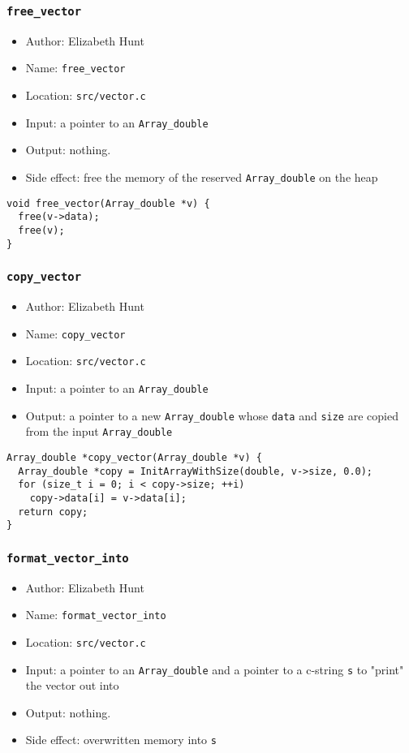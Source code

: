 \documentclass[11pt]{article}
\begin{document}
\subsubsection{\texttt{free\_vector}}
\label{sec:org983efcf}
\begin{itemize}
\item Author: Elizabeth Hunt
\item Name: \texttt{free\_vector}
\item Location: \texttt{src/vector.c}
\item Input: a pointer to an \texttt{Array\_double}
\item Output: nothing.
\item Side effect: free the memory of the reserved \texttt{Array\_double} on the heap
\end{itemize}

\begin{verbatim}
void free_vector(Array_double *v) {
  free(v->data);
  free(v);
}
\end{verbatim}

\subsubsection{\texttt{copy\_vector}}
\label{sec:orgde05d32}
\begin{itemize}
\item Author: Elizabeth Hunt
\item Name: \texttt{copy\_vector}
\item Location: \texttt{src/vector.c}
\item Input: a pointer to an \texttt{Array\_double}
\item Output: a pointer to a new \texttt{Array\_double} whose \texttt{data} and \texttt{size} are copied from the input
\texttt{Array\_double}
\end{itemize}

\begin{verbatim}
Array_double *copy_vector(Array_double *v) {
  Array_double *copy = InitArrayWithSize(double, v->size, 0.0);
  for (size_t i = 0; i < copy->size; ++i)
    copy->data[i] = v->data[i];
  return copy;
}
\end{verbatim}

\subsubsection{\texttt{format\_vector\_into}}
\label{sec:org2e779f3}
\begin{itemize}
\item Author: Elizabeth Hunt
\item Name: \texttt{format\_vector\_into}
\item Location: \texttt{src/vector.c}
\item Input: a pointer to an \texttt{Array\_double} and a pointer to a c-string \texttt{s} to "print" the vector out
into
\item Output: nothing.
\item Side effect: overwritten memory into \texttt{s}
\end{itemize}
\end{document}
